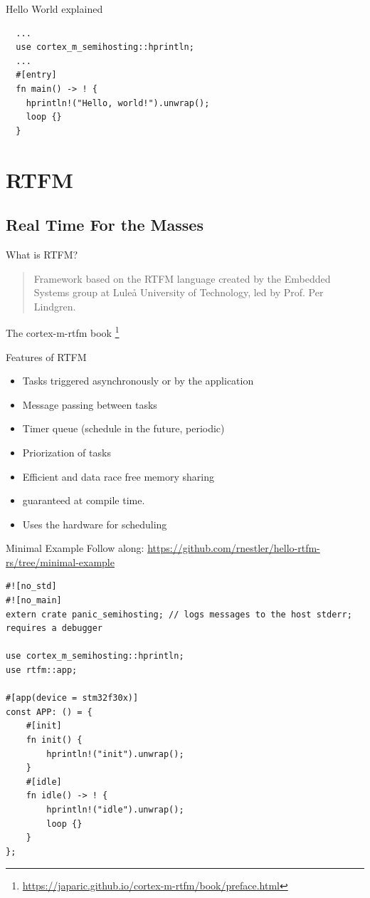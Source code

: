 \documentclass[aspectratio=1610,14pt,t]{beamer}
\begin{document}
\begin{frame}[c,fragile]{Hello World explained}
  \begin{verbatim}
  ...
  use cortex_m_semihosting::hprintln;
  ...
  #[entry]
  fn main() -> ! {
    hprintln!("Hello, world!").unwrap();
    loop {}
  }
  \end{verbatim}
\end{frame}

\section{RTFM}
\subsection{Real Time For the Masses}

\begin{frame}[c]{What is RTFM?}
  \begin{quote}
    Framework based on the RTFM language created by the Embedded Systems group
    at Luleå University of Technology, led by Prof. Per Lindgren.
  \end{quote}
  The cortex-m-rtfm book \footnote{\url{https://japaric.github.io/cortex-m-rtfm/book/preface.html}}
\end{frame}

\begin{frame}[c]{Features of RTFM}
  \begin{itemize}
      \item Tasks triggered asynchronously or by the application
      \item Message passing between tasks
      \item Timer queue (schedule in the future, periodic)
      \item Priorization of tasks
      \item Efficient and data race free memory sharing
      \item {} guaranteed at compile time.
      \item Uses the hardware for scheduling
  \end{itemize}
\end{frame}

\begin{frame}[fragile]{Minimal Example}
  \small{Follow along: \url{https://github.com/rnestler/hello-rtfm-rs/tree/minimal-example}}
  \begin{verbatim}
#![no_std]
#![no_main]
extern crate panic_semihosting; // logs messages to the host stderr; requires a debugger

use cortex_m_semihosting::hprintln;
use rtfm::app;

#[app(device = stm32f30x)]
const APP: () = {
    #[init]
    fn init() {
        hprintln!("init").unwrap();
    }
    #[idle]
    fn idle() -> ! {
        hprintln!("idle").unwrap();
        loop {}
    }
};
  \end{verbatim}
\end{frame}
\end{document}
